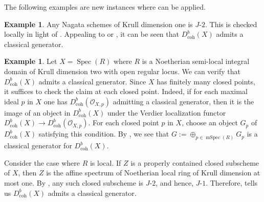 \documentclass[11pt]{amsart}
\theoremstyle{plain}
\theoremstyle{definition}
\newtheorem{example}[theorem]{Example}
\numberwithin{equation}{section}
\numberwithin{theorem}{section}
\begin{document}
The following examples are new instances where  can be applied.

\begin{example}
    Any Nagata schemes of Krull dimension one is $J\textrm{-}2$. This is checked locally in light of \cite[\href{https://stacks.math.columbia.edu/tag/07PJ}{Tag 07PJ}]{StacksProject}. Appealing to \cite[Theorem 4.15]{Elagin/Lunts/Schnurer:2020} or , it can be seen that $D^b_{\operatorname{coh}}(X)$ admits a classical generator.
\end{example}

\begin{example}
    Let $X=\operatorname{Spec}(R)$ where $R$ is a Noetherian semi-local integral domain of Krull dimension two with open regular locus. We can verify that $D^b_{\operatorname{coh}}(X)$ admits a classical generator. Since $X$ has finitely many closed points, it suffices to check the claim at each closed point. Indeed, if for each maximal ideal $p$ in $X$ one has $D^b_{\operatorname{coh}}(\mathcal{O}_{X,p})$ admitting a classical generator, then it is the image of an object in $D^b_{\operatorname{coh}}(X)$ under the Verdier localization functor $D^b_{\operatorname{coh}}(X) \to D^b_{\operatorname{coh}}(\mathcal{O}_{X,p})$. For each closed point $p$ in $X$, choose an object $G_p$ of $D^b_{\operatorname{coh}}(X)$ satisfying this condition. By \cite[Theorem 3.6]{Letz:2021}, we see that $G:= \oplus_{p\in \operatorname{mSpec}(R)} G_p$ is a classical generator for $D^b_{\operatorname{coh}}(X)$. 
    
    Consider the case where $R$ is local. If $Z$ is a properly contained closed subscheme of $X$, then $Z$ is the affine spectrum of Noetherian local ring of Krull dimension at most one. By \cite[\href{https://stacks.math.columbia.edu/tag/07PJ}{Tag 07PJ}]{StacksProject}, any such closed subscheme is $J\textrm{-}2$, and hence, $J\textrm{-}1$. Therefore,  tells us $D^b_{\operatorname{coh}}(X)$ admits a classical generator.
\end{example}
\end{document}
